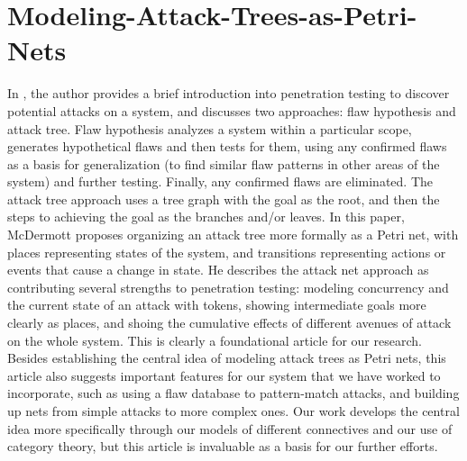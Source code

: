 \section{Modeling-Attack-Trees-as-Petri-Nets}
\par In \cite{McDermott:2001:ANP:366173.366183}, the author provides a brief introduction into penetration testing to discover potential attacks on a system, and discusses two approaches: flaw hypothesis and attack tree. Flaw hypothesis analyzes a system within a particular scope, generates hypothetical flaws and then tests for them, using any confirmed flaws as a basis for generalization (to find similar flaw patterns in other areas of the system) and further testing. Finally, any confirmed flaws are eliminated. The attack tree approach uses a tree graph with the goal as the root, and then the steps to achieving the goal as the branches and/or leaves. In this paper, McDermott proposes organizing an attack tree more formally as a Petri net, with places representing states of the system, and transitions representing actions or events that cause a change in state. He describes the attack net approach as contributing several strengths to penetration testing: modeling concurrency and the current state of an attack with tokens, showing intermediate goals more clearly as places, and shoing the cumulative effects of different avenues of attack on the whole system. This is clearly a foundational article for our research. Besides establishing the central idea of modeling attack trees as Petri nets, this article also suggests important features for our system that we have worked to incorporate, such as using a flaw database to pattern-match attacks, and building up nets from simple attacks to more complex ones. Our work develops the central idea more specifically through our models of different connectives and our use of category theory, but this article is invaluable as a basis for our further efforts.
